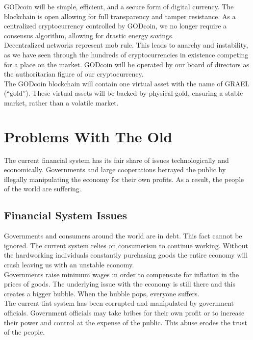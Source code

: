 \documentclass[12pt,a4paper]{article}
\begin{document}
  GODcoin will be simple, efficient, and a secure form of digital currency. The
  blockchain is open allowing for full transparency and tamper resistance. As a
  centralized cryptocurrency controlled by GODcoin, we no longer require a
  consensus algorithm, allowing for drastic energy savings.\\

  Decentralized networks represent mob rule. This leads to anarchy and
  instability, as we have seen through the hundreds of cryptocurrencies in
  existence competing for a place on the market. GODcoin will be operated by our
  board of directors as the authoritarian figure of our cryptocurrency.\\

  The GODcoin blockchain will contain one virtual asset with the name of GRAEL (``gold''). These virtual assets will be backed by physical gold, ensuring a
  stable market, rather than a volatile market.

  \section{Problems With The Old}
  The current financial system has its fair share of issues technologically and
  economically. Governments and large cooperations betrayed the public by
  illegally manipulating the economy for their own profits. As a result, the
  people of the world are suffering.

  \subsection{Financial System Issues}
  Governments and consumers around the world are in debt. This fact cannot be
  ignored. The current system relies on consumerism to continue working. Without
  the hardworking individuals constantly purchasing goods the entire economy
  will crash leaving us with an unstable economy.\\

  Governments raise minimum wages in order to compensate for inflation in the
  prices of goods. The underlying issue with the economy is still there and this
  creates a bigger bubble. When the bubble pops, everyone suffers.\\

  The current fiat system has been corrupted and manipulated by government
  officials. Government officials may take bribes for their own profit or to
  increase their power and control at the expense of the public. This abuse
  erodes the trust of the people.\\
\end{document}
